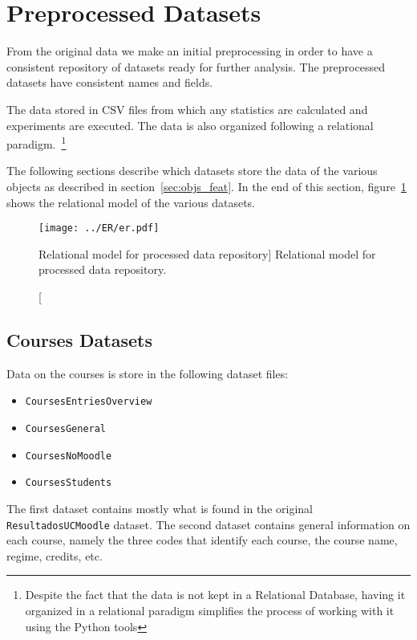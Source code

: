 \section{Preprocessed Datasets}
\label{sec:preproc_dataset}

From the original data we make an initial preprocessing in order to have a
consistent repository of datasets ready for further analysis. The preprocessed
datasets have consistent names and fields.

The data stored in CSV files from which any statistics are calculated and
experiments are executed. The data is also organized following a relational
paradigm.~\footnote{Despite the fact that the data is not kept in a Relational
Database, having it organized in a relational paradigm simplifies the process
of working with it using the Python tools}

The following sections describe which datasets store the data of the various
objects as described in section~\ref{sec:objs_feat}. In the end of this
section, figure~\ref{fig:er} shows the relational model of the various datasets.

\begin{figure}[h!]
    \centering

    \texttt{[image: ../ER/er.pdf]}

    \caption
        [Relational model for processed data repository]
        {Relational model for processed data repository.}

    \label{fig:er}
\end{figure}

\subsection{Courses Datasets}

Data on the courses is store in the following dataset files:

\begin{itemize}
    \item \texttt{CoursesEntriesOverview}
    \item \texttt{CoursesGeneral}
    \item \texttt{CoursesNoMoodle}
    \item \texttt{CoursesStudents}
\end{itemize}

The first dataset contains mostly what is found in the original
\texttt{ResultadosUCMoodle} dataset. The second dataset contains general
information on each course, namely the three codes that identify each course,
the course name, regime, credits, etc.

